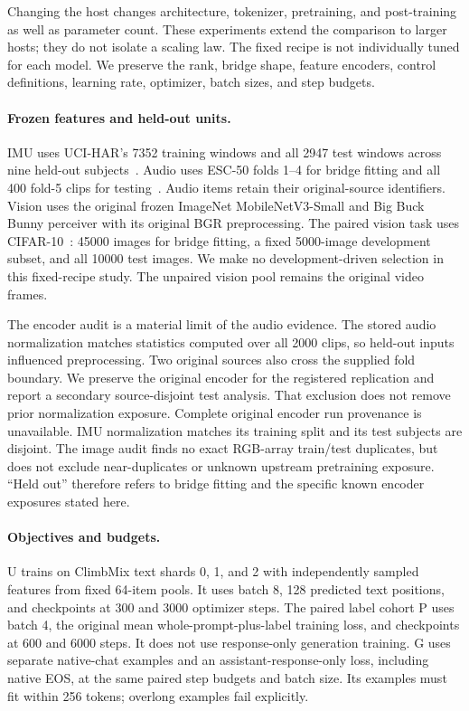 \documentclass[11pt]{article}
\begin{document}


Changing the host changes architecture, tokenizer, pretraining, and post-training
as well as parameter count. These experiments extend the comparison to larger
hosts; they do not isolate a scaling law. The fixed recipe is not individually
tuned for each model. We preserve the rank, bridge shape, feature encoders,
control definitions, learning rate, optimizer, batch sizes, and step budgets.

\paragraph{Frozen features and held-out units.}
IMU uses UCI-HAR's 7352 training windows and all 2947 test windows across nine
held-out subjects~\cite{anguita2013uci}. Audio uses ESC-50 folds 1--4 for bridge
fitting and all 400 fold-5 clips for testing~\cite{piczak2015esc}. Audio items
retain their original-source identifiers. Vision uses the original frozen
ImageNet MobileNetV3-Small and Big Buck Bunny perceiver with its original BGR
preprocessing. The paired vision task uses CIFAR-10~\cite{krizhevsky2009cifar}:
45000 images for bridge fitting, a fixed 5000-image development subset, and all
10000 test images. We make no development-driven selection in this fixed-recipe
study. The unpaired vision pool remains the original video frames.

The encoder audit is a material limit of the audio evidence. The stored audio
normalization matches statistics computed over all 2000 clips, so held-out
inputs influenced preprocessing. Two original sources also cross the supplied
fold boundary. We preserve the original encoder for the registered replication
and report a secondary source-disjoint test analysis. That exclusion does not
remove prior normalization exposure. Complete original encoder run provenance
is unavailable. IMU normalization matches its training split and its test
subjects are disjoint. The image audit finds no exact RGB-array train/test
duplicates, but does not exclude near-duplicates or unknown upstream
pretraining exposure. ``Held out'' therefore refers to bridge fitting and the
specific known encoder exposures stated here.

\paragraph{Objectives and budgets.}
U trains on ClimbMix text shards 0, 1, and 2 with independently sampled features
from fixed 64-item pools. It uses batch 8, 128 predicted text positions, and
checkpoints at 300 and 3000 optimizer steps. The paired label cohort P uses
batch 4, the original mean whole-prompt-plus-label training loss, and
checkpoints at 600 and 6000 steps. It does not use response-only generation
training. G uses separate native-chat examples and an assistant-response-only
loss, including native EOS, at the same paired step budgets and batch size.
Its examples must fit within 256 tokens; overlong examples fail explicitly.
\end{document}
